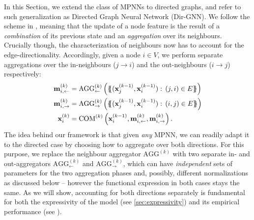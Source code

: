 \documentclass{article}
\newcommand{\inp}{\leftarrow}
\newcommand{\out}{\rightarrow}
\newcommand\ours{Directed Graph Neural Network}
\newcommand\oursacro{Dir-GNN}
\newcommand\m{m}
\newcommand\ilayer{k}
\newcommand*{\ldblbrace}{\{\mskip-6mu\{}
\newcommand*{\rdblbrace}{\}\mskip-6mu\}}
\theoremstyle{plain}
\theoremstyle{definition}
\theoremstyle{remark}
\begin{document}
In this Section, we extend the class of MPNNs to directed graphs, and refer to such generalization as \ours{} (\oursacro{}). We follow the scheme in , meaning that the update of a node feature is the result of a {\em combination} of its previous state and an {\em aggregation} over its neighbours. Crucially though, the characterization of neighbours now has to account for the edge-directionality. Accordingly, given a node $i\in V$, we perform separate aggregations over the in-neighbours ($j \rightarrow i$) and the out-neighbours ($i\rightarrow j$) respectively:
\begin{align}\label{eq:directed-mpnn}
\begin{split}
    \mathbf{\m}^{(k)}_{i,\inp} &= \mathrm{AGG}^{(k)}_{\inp}\left(\ldblbrace (\mathbf{x}_{j}^{(\ilayer-1)}, \mathbf{x}_{i}^{(\ilayer-1)}) : \, (j,i)\in E\rdblbrace \right) \\  
    \mathbf{\m}^{(k)}_{i,\out} &= \mathrm{AGG}^{(k)}_{\out}\left(\ldblbrace (\mathbf{x}_{j}^{(\ilayer-1)}, \mathbf{x}_{i}^{(\ilayer-1)}) : \, (i,j)\in E \rdblbrace  \right) \\
    \mathbf{x}_{i}^{(k)} &= \mathrm{COM}^{(k)}\left(\mathbf{x}_{i}^{(k-1)},\mathbf{\m}^{(k)}_{i,\inp}, \mathbf{\m}^{(k)}_{i,\out}\right).
\end{split}
\end{align}
\noindent The idea behind our framework is that given {\em any} MPNN, we can readily adapt it to the directed case by choosing how to aggregate over both directions. For this purpose, we replace the neighbour aggregator $\mathrm{AGG}^{(k)}$ with two separate in- and out-aggregators $\mathrm{AGG}^{(k)}_{\inp}$ and $\mathrm{AGG}^{(k)}_{\out}$, which can have {\em independent} sets of parameters for the two aggregation phases and, possibly, different normalizations as discussed below -- however the functional expression in both cases stays the same. As we will show, accounting for both directions separately is fundamental for both the expressivity of the model (see \cref{sec:expressivity}) and its empirical performance (see ).
\end{document}
